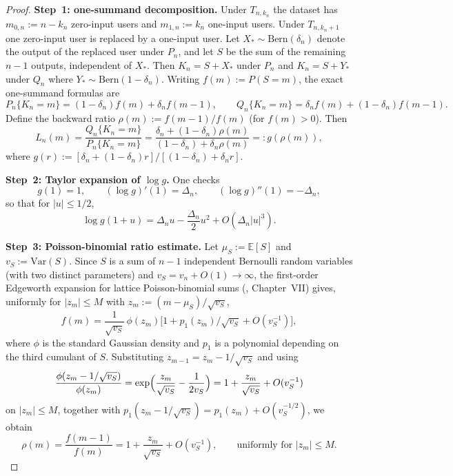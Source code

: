 \documentclass{article}
\begin{document}
\begin{proof}
\textbf{Step~1: one-summand decomposition.}
Under $T_{n,k_n}$ the dataset has $m_{0,n}:=n-k_n$ zero-input users and $m_{1,n}:=k_n$ one-input
users. Under $T_{n,k_n+1}$ one zero-input user is replaced by a one-input user.
Let $X_*\sim\mathrm{Bern}(\delta_n)$ denote the output of the replaced user under $P_n$,
and let $S$ be the sum of the remaining $n-1$ outputs, independent of $X_*$.
Then $K_n=S+X_*$ under $P_n$ and $K_n=S+Y_*$ under $Q_n$ where $Y_*\sim\mathrm{Bern}(1-\delta_n)$.
Writing $f(m):=P(S=m)$, the exact one-summand formulas are
\[
P_n\{K_n=m\}=(1-\delta_n)f(m)+\delta_n f(m-1),
\qquad
Q_n\{K_n=m\}=\delta_n f(m)+(1-\delta_n)f(m-1).
\]
Define the backward ratio $\rho(m):=f(m-1)/f(m)$ (for $f(m)>0$). Then
\begin{equation}
L_n(m)=\frac{Q_n\{K_n=m\}}{P_n\{K_n=m\}}
=\frac{\delta_n+(1-\delta_n)\rho(m)}{(1-\delta_n)+\delta_n\rho(m)}
=:g(\rho(m)),
\label{eq:LR-general-k}
\end{equation}
where $g(r):=[\delta_n+(1-\delta_n)r]/[(1-\delta_n)+\delta_n r]$.

\medskip
\textbf{Step~2: Taylor expansion of $\log g$.}
One checks
\[
g(1)=1,
\qquad
(\log g)'(1)=\Delta_n,
\qquad
(\log g)''(1)=-\Delta_n,
\]
so that for $|u|\le 1/2$,
\begin{equation}
\log g(1+u)=\Delta_n u-\frac{\Delta_n}{2}u^2+O(\Delta_n|u|^3).
\label{eq:logg-taylor}
\end{equation}

\medskip
\textbf{Step~3: Poisson-binomial ratio estimate.}
Let $\mu_S:=\mathbb E[S]$ and $v_S:=\mathrm{Var}(S)$. Since $S$ is a sum of $n-1$ independent Bernoulli
random variables (with two distinct parameters) and $v_S=v_n+O(1)\to\infty$,
the first-order Edgeworth expansion for lattice Poisson-binomial sums
(\cite{Pet75}, Chapter~VII) gives, uniformly for $|z_m|\le M$ with $z_m:=(m-\mu_S)/\sqrt{v_S}$,
\[
f(m)=\frac{1}{\sqrt{v_S}}\,\phi(z_m)\bigl[1+p_1(z_m)/\sqrt{v_S}+O(v_S^{-1})\bigr],
\]
where $\phi$ is the standard Gaussian density and $p_1$ is a polynomial depending on the
third cumulant of $S$. Substituting $z_{m-1}=z_m-1/\sqrt{v_S}$ and using
\[
\frac{\phi(z_m-1/\sqrt{v_S})}{\phi(z_m)}
=\exp\Bigl(\frac{z_m}{\sqrt{v_S}}-\frac{1}{2v_S}\Bigr)
=1+\frac{z_m}{\sqrt{v_S}}+O(v_S^{-1})
\]
on $|z_m|\le M$, together with $p_1(z_m-1/\sqrt{v_S})=p_1(z_m)+O(v_S^{-1/2})$, we obtain
\begin{equation}
\rho(m)=\frac{f(m-1)}{f(m)}=1+\frac{z_m}{\sqrt{v_S}}+O(v_S^{-1}),
\qquad\text{uniformly for }|z_m|\le M.
\label{eq:ratio-edgeworth}
\end{equation}


\end{proof}
\end{document}
